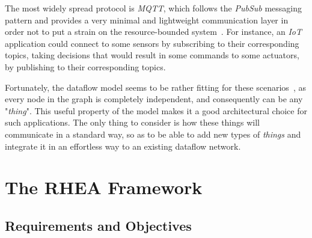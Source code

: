 \documentclass[sigplan,screen]{acmart}
\begin{document}
The most widely spread protocol is \textit{MQTT}, which follows the \textit{PubSub}
messaging pattern and provides a very minimal and lightweight communication layer
in order not to put a strain on the resource-bounded system~\cite{mqtt}.
For instance, an \textit{IoT} application could connect to some sensors by
subscribing to their corresponding topics, taking decisions that would result in
some commands to some actuators, by publishing to their corresponding topics.

Fortunately, the dataflow model seems to be rather fitting for these
scenarios~\cite{iot_dataflow}, as every node in the graph is completely
independent, and consequently can be any "\textit{thing}". This useful property
of the model makes it a good architectural choice for such applications. The
only thing to consider is how these things will communicate in a standard way,
so as to be able to add new types of \textit{things} and integrate it in an
effortless way to an existing dataflow network.

\section{The RHEA Framework} \label{sec:approach}

\subsection{Requirements and Objectives} \label{sec:requirements}
\end{document}

